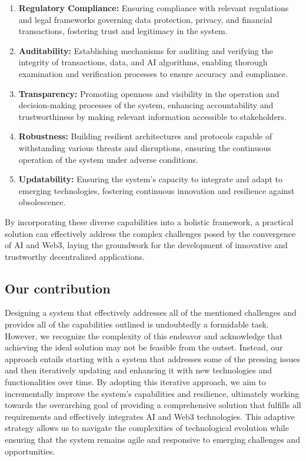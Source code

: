 \documentclass[conference]{IEEEtran}
\begin{document}
\begin{enumerate}
    \item \textbf{Regulatory Compliance:} Ensuring compliance with relevant regulations and legal frameworks governing data protection, privacy, and financial transactions, fostering trust and legitimacy in the system.

    \item \textbf{Auditability:} Establishing mechanisms for auditing and verifying the integrity of transactions, data, and AI algorithms, enabling thorough examination and verification processes to ensure accuracy and compliance.

    \item \textbf{Transparency:} Promoting openness and visibility in the operation and decision-making processes of the system, enhancing accountability and trustworthiness by making relevant information accessible to stakeholders.

    \item \textbf{Robustness:} Building resilient architectures and protocols capable of withstanding various threats and disruptions, ensuring the continuous operation of the system under adverse conditions.

    \item \textbf{Updatability:} Ensuring the system's capacity to integrate and adapt to emerging technologies, fostering continuous innovation and resilience against obsolescence.

\end{enumerate}

By incorporating these diverse capabilities into a holistic framework, a practical solution can effectively address the complex challenges posed by the convergence of AI and Web3, laying the groundwork for the development of innovative and trustworthy decentralized applications.

\subsection{Our contribution}

Designing a system that effectively addresses all of the mentioned challenges and provides all of the capabilities outlined is undoubtedly a formidable task. However, we recognize the complexity of this endeavor and acknowledge that achieving the ideal solution may not be feasible from the outset. Instead, our approach entails starting with a system that addresses some of the pressing issues and then iteratively updating and enhancing it with new technologies and functionalities over time. By adopting this iterative approach, we aim to incrementally improve the system's capabilities and resilience, ultimately working towards the overarching goal of providing a comprehensive solution that fulfills all requirements and effectively integrates AI and Web3 technologies. This adaptive strategy allows us to navigate the complexities of technological evolution while ensuring that the system remains agile and responsive to emerging challenges and opportunities.
\end{document}
